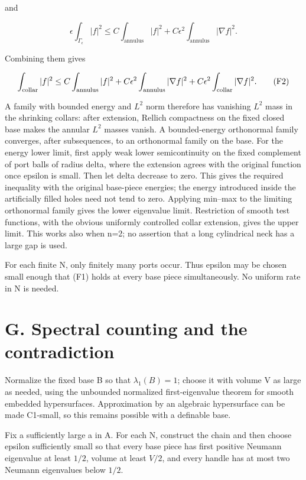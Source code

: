 \documentclass[11pt,a4paper]{article}
\begin{document}
and

\[
 \epsilon\int_{\Gamma_\epsilon}|f|^2
 \le C\int_{\mathrm{annulus}}|f|^2
       +C\epsilon^2\int_{\mathrm{annulus}}|\nabla f|^2.
\]

Combining them gives

\[
 \int_{\rm collar}|f|^2
 \le C\int_{\rm annulus}|f|^2
   +C\epsilon^2\int_{\rm annulus}|\nabla f|^2
   +C\epsilon^2\int_{\rm collar}|\nabla f|^2.
 \tag{F2}
\]

A family with bounded energy and \(L^2\) norm therefore has vanishing
\(L^2\) mass in the shrinking collars: after extension, Rellich
compactness on the fixed closed base makes the annular \(L^2\) masses
vanish. A bounded-energy orthonormal family converges, after
subsequences, to an orthonormal family on the base. For the energy lower
limit, first apply weak lower semicontinuity on the fixed complement of
port balls of radius delta, where the extension agrees with the original
function once epsilon is small. Then let delta decrease to zero. This
gives the required inequality with the original base-piece energies; the
energy introduced inside the artificially filled holes need not tend to
zero. Applying min--max to the limiting orthonormal family gives the
lower eigenvalue limit. Restriction of smooth test functions, with the
obvious uniformly controlled collar extension, gives the upper limit.
This works also when n=2; no assertion that a long cylindrical neck has
a large gap is used.

For each finite N, only finitely many ports occur. Thus epsilon may be
chosen small enough that (F1) holds at every base piece simultaneously.
No uniform rate in N is needed.

\hypertarget{1022-g.-spectral-counting-and-the-contradiction}{%
\section{G. Spectral counting and the
contradiction}\label{1022-g.-spectral-counting-and-the-contradiction}}

Normalize the fixed base B so that \(\lambda _1(B)=1\); choose it with
volume V as large as needed, using the unbounded normalized
first-eigenvalue theorem for smooth embedded hypersurfaces.
Approximation by an algebraic hypersurface can be made C1-small, so this
remains possible with a definable base.

Fix a sufficiently large a in A. For each N, construct the chain and
then choose epsilon sufficiently small so that every base piece has
first positive Neumann eigenvalue at least \(1/2\), volume at least
\(V/2\), and every handle has at most two Neumann eigenvalues below
\(1/2\).
\end{document}

